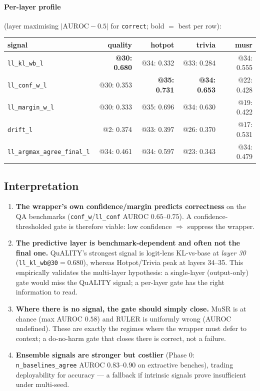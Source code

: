 \documentclass[11pt]{article}
\newcommand{\code}[1]{\texttt{#1}}
\begin{document}
\paragraph{Per-layer profile} (layer maximising $|\mathrm{AUROC}-0.5|$
for \texttt{correct}; bold $=$ best per row):
\begin{center}\small
\begin{tabular}{l rrrr}
\toprule
signal & quality & hotpot & trivia & musr\\
\midrule
\code{ll\_kl\_wb\_l}            & \textbf{@30: 0.680} & @34: 0.332 & @33: 0.284 & @34: 0.555\\
\code{ll\_conf\_w\_l}          & @30: 0.353 & \textbf{@35: 0.731} & \textbf{@34: 0.653} & @22: 0.428\\
\code{ll\_margin\_w\_l}        & @30: 0.333 & @35: 0.696 & @34: 0.630 & @19: 0.422\\
\code{drift\_l}                & @2: 0.374  & @33: 0.397 & @26: 0.370 & @17: 0.531\\
\code{ll\_argmax\_agree\_final\_l} & @34: 0.461 & @34: 0.597 & @23: 0.343 & @34: 0.479\\
\bottomrule
\end{tabular}
\end{center}

\subsection{Interpretation}
\begin{enumerate}
\item \textbf{The wrapper's own confidence/margin predicts correctness}
on the QA benchmarks (\code{conf\_w}/\code{ll\_conf} AUROC $0.65$--$0.75$).
A confidence-thresholded gate is therefore viable: low confidence
$\Rightarrow$ suppress the wrapper.
\item \textbf{The predictive layer is benchmark-dependent and often not
the final one.} QuALITY's strongest signal is logit-lens KL-vs-base at
\emph{layer 30} (\code{ll\_kl\_wb@30}$=0.680$), whereas Hotpot/Trivia
peak at layers 34--35. This empirically validates the multi-layer
hypothesis: a single-layer (output-only) gate would miss the QuALITY
signal; a per-layer gate has the right information to read.
\item \textbf{Where there is no signal, the gate should simply close.}
MuSR is at chance (max AUROC $0.58$) and RULER is uniformly wrong
(AUROC undefined). These are exactly the regimes where the wrapper must
defer to context; a do-no-harm gate that closes there is correct, not a
failure.
\item \textbf{Ensemble signals are stronger but costlier} (Phase 0:
\code{n\_baselines\_agree} AUROC $0.83$--$0.90$ on extractive benches),
trading deployability for accuracy --- a fallback if intrinsic signals
prove insufficient under multi-seed.
\end{enumerate}
\end{document}
